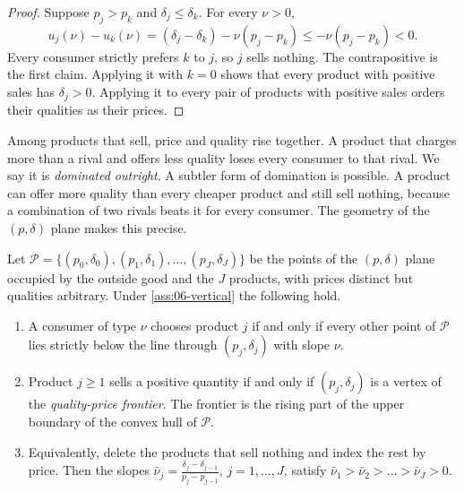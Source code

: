 \begin{proof}
Suppose $p_j > p_k$ and $\delta_j \le \delta_k$. For every $\nu > 0$,
\begin{equation*}
  u_j(\nu) - u_k(\nu) = (\delta_j - \delta_k) - \nu(p_j - p_k) \le -\nu(p_j - p_k) < 0 .
\end{equation*}
Every consumer strictly prefers $k$ to $j$, so $j$ sells nothing. The contrapositive is the first claim.
Applying it with $k = 0$ shows that every product with positive sales has $\delta_j > 0$. Applying it to
every pair of products with positive sales orders their qualities as their prices.
\end{proof}

Among products that sell, price and quality rise together. A product that charges more than a rival and
offers less quality loses every consumer to that rival. We say it is \emph{dominated outright}. A subtler
form of domination is possible. A product can offer more quality than every cheaper product and still sell
nothing, because a combination of two rivals beats it for every consumer. The geometry of the
$(p, \delta)$ plane makes this precise.

\begin{proposition}\label{prop:06-frontier}
Let $\mathcal P = \{(p_0, \delta_0), (p_1, \delta_1), \dots, (p_J, \delta_J)\}$ be the points of the
$(p, \delta)$ plane occupied by the outside good and the $J$ products, with prices distinct but qualities
arbitrary. Under \cref{ass:06-vertical} the following hold.
\begin{enumerate}[label=(\roman*)]
  \item A consumer of type $\nu$ chooses product $j$ if and only if every other point of $\mathcal P$ lies
        strictly below the line through $(p_j, \delta_j)$ with slope $\nu$.
  \item Product $j \ge 1$ sells a positive quantity if and only if $(p_j, \delta_j)$ is a vertex of the
        \emph{quality-price frontier}. The frontier is the rising part of the upper boundary of the
        convex hull of $\mathcal P$.
  \item Equivalently, delete the products that sell nothing and index the rest by price. Then the slopes
        $\bar\nu_j = \frac{\delta_j - \delta_{j-1}}{p_j - p_{j-1}}$, $j = 1, \dots, J$, satisfy
        $\bar\nu_1 > \bar\nu_2 > \dots > \bar\nu_J > 0$.
\end{enumerate}
\end{proposition}

